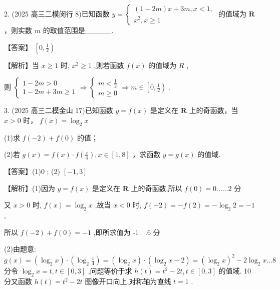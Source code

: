 \documentclass[10pt]{article}
\begin{document}
2. (2025 高三二模闵行 8)已知函数 \(y = \left\{  \begin{array}{l} \left( {1 - {2m}}\right) x + {3m},x < 1, \\  {x}^{2},x \geq  1 \end{array}\right.\) 的值域为 \(\mathbf{R}\) ，则实数 \(m\) 的取值范围是\_\_\_\_\_.

【答案】 \(\left\lbrack  {0,\frac{1}{2}}\right)\)

【解析】当 \(x \geq  1\) 时, \({x}^{2} \geq  1\) ,则若函数 \(f\left( x\right)\) 的值域为 \(R\) ,

则 \(\left\{  {\begin{array}{l} 1 - {2m} > 0 \\  1 - {2m} + {3m} \geq  1 \end{array} \Rightarrow  \left\{  {\begin{array}{l} m < \frac{1}{2} \\  m \geq  0 \end{array} \Rightarrow  m \in  \left\lbrack  {0,\frac{1}{2}}\right) }\right. }\right.\) .

3. (2025 高三二模金山 17)已知函数 \(y = f\left( x\right)\) 是定义在 \(\mathbf{R}\) 上的奇函数，当 \(x > 0\) 时， \(f\left( x\right)  = {\log }_{2}x\)

(1)求 \(f\left( {-2}\right)  + f\left( 0\right)\) 的值；

(2)若 \(g\left( x\right)  = f\left( x\right)  \cdot  f\left( \frac{x}{4}\right) ,x \in  \left\lbrack  {1,8}\right\rbrack\) ，求函数 \(y = g\left( x\right)\) 的值域.

【答案】(1)0 ; (2) \(\left\lbrack  {-1,3}\right\rbrack\)

【解析】(1)因为 \(y = f\left( x\right)\) 是定义在 \(\mathbf{R}\) 上的奇函数,所以 \(f\left( 0\right)  = 0\ldots \ldots 2\) 分

又 \(x > 0\) 时, \(f\left( x\right)  = {\log }_{2}x\) ,故当 \(x < 0\) 时, \(f\left( {-2}\right)  =  - f\left( 2\right)  =  - {\log }_{2}2 =  - 1\) ,

所以 \(f\left( {-2}\right)  + f\left( 0\right)  =  - 1\) ,即所求值为 -1 . .6 分

(2)由题意: \(g\left( x\right)  = \left( {{\log }_{2}x}\right)  \cdot  \left( {{\log }_{2}\frac{x}{4}}\right)  = \left( {{\log }_{2}x}\right)  \cdot  \left( {{\log }_{2}x - 2}\right)  = {\left( {\log }_{2}x\right) }^{2} - 2{\log }_{2}x..{.8}\) 分令 \({\log }_{2}x = t,t \in  \left\lbrack  {0,3}\right\rbrack\) ,问题等价于求 \(h\left( t\right)  = {t}^{2} - {2t},t \in  \left\lbrack  {0,3}\right\rbrack\) 的值域. 10 分又函数 \(h\left( t\right)  = {t}^{2} - {2t}\) 图像开口向上,对称轴为直线 \(t = 1\) .
\end{document}
